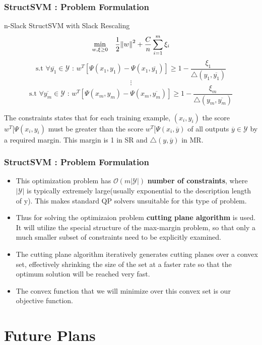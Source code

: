 \documentclass{beamer}
\begin{document}
\begin{frame}
\frametitle{StructSVM : Problem Formulation}
\begin{block}{n-Slack StructSVM with Slack Rescaling}
\[\underset{w, \xi \geq 0}{\min} \quad \frac{1}{2} \norm{w}^2 + \frac{C}{n} \sum_{i=1}^m \xi_i \]
\[ \textrm{s.t } \forall \overline{y_1} \in \mathcal{Y} \textrm{  :  } w^T[\Psi(x_1, y_1) - \Psi(x_1, \overline{y_1})] \geq 1 - \frac{\xi_1}{\bigtriangleup(y_1, \overline{y_1})} \]
\[ \vdots \]
\[ \textrm{s.t } \forall \overline{y_m} \in \mathcal{Y} \textrm{  :  } w^T[\Psi(x_m, y_m) - \Psi(x_m, \overline{y_m})] \geq 1 - \frac{\xi_m}{\bigtriangleup(y_m, \overline{y_m})} \]
\end{block}
The constraints states that for each training example, $(x_i, y_i)$ the score $w^T[\Psi(x_i, y_i)$ must be greater than the score $w^T[\Psi(x_i, \overline{y})$ of all outputs $\overline{y} \in \mathcal{Y}$ by a required margin. This margin is 1 in SR and $\bigtriangleup(y, \overline{y})$ in MR.
\end{frame}


\begin{frame}
\frametitle{StructSVM : Problem Formulation}
\begin{itemize}
\item This optimization problem has $\mathcal{O}(m|\mathcal{Y}|)$ \textbf{number of constraints}, where $|\mathcal{Y}|$ is typically extremely large(usually exponential to the description length of y). This makes standard QP solvers unsuitable for this type of problem.

\item Thus for solving the optimizaion problem \textbf{cutting plane algorithm} is used. It will utilize the special structure of the max-margin problem, so that only a much smaller subset of constraints need to be explicitly examined.

\item The cutting plane algorithm iteratively generates cutting planes over a convex set, effectively shrinking the size of the set at a faster rate so that the optimum solution will be reached very fast.

\item The convex function that we will minimize over this convex set is our objective function.
\end{itemize}

\end{frame}

\section{Future Plans}
\end{document}
